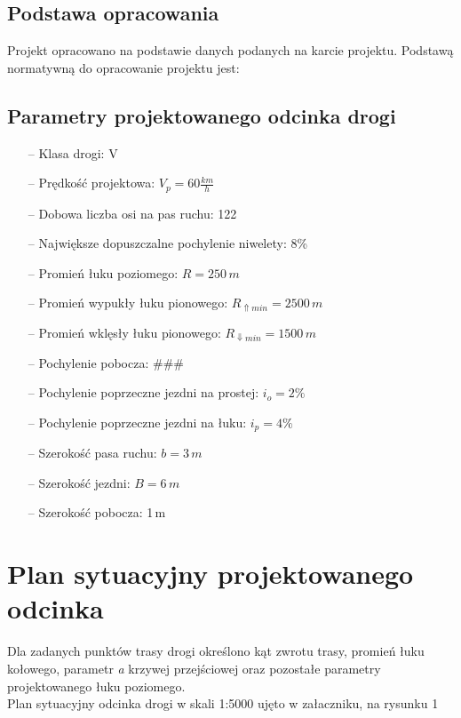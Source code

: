 \documentclass[12pt]{article}
\begin{document}
    \subsection{Podstawa opracowania}
    Projekt opracowano na podstawie danych podanych na karcie projektu.
    Podstawą normatywną do opracowanie projektu jest: 
    
    \selectfont{"Rozporządzenie Ministra Transportu i Gospodarki Morskiej z dnia 2 Marca 1999r.\\
    w sprawie warunków technicznych jakim powinny odpowiadać drogi publiczne\\ i ich usytuowanie"\qquad Dz. U. Nr 43 poz.430}
\newpage

    \subsection{Parametry projektowanego odcinka drogi}
    \begin{itemize}
        \item [--] Klasa drogi: V
        \item [--] Prędkość projektowa: \(V_{p}=60\frac{km}{h}\)
        \item [--] Dobowa liczba osi na pas ruchu: 122
        \item [--] Największe dopuszczalne pochylenie niwelety: 8\%
        \item [--] Promień łuku poziomego: \(R=250\,m\)
        \item [--] Promień wypukły łuku pionowego: \(R_{\Uparrow min} = 2500\,m\)
        \item [--] Promień wklęsły łuku pionowego: \(R_{\Downarrow min} = 1500\,m\)
        \item [--] Pochylenie pobocza: \#\#\#
        \item [--] Pochylenie poprzeczne jezdni na prostej: \( i_{o}=2\% \)
        \item [--] Pochylenie poprzeczne jezdni na łuku: \( i_{p}=4\% \)
        \item [--] Szerokość pasa ruchu: \(b=3\,m \)
        \item [--] Szerokość jezdni: \(B=6\,m\)
        \item [--] Szerokość pobocza: 1\,m
    \end{itemize}
    \newpage

\section{Plan sytuacyjny projektowanego odcinka}
    \quad Dla zadanych punktów trasy drogi określono kąt zwrotu trasy, promień łuku kołowego, parametr \textit{a} krzywej przejściowej oraz pozostałe parametry projektowanego łuku poziomego.\\
    \quad Plan sytuacyjny odcinka drogi w skali 1:5000 ujęto w załaczniku, na rysunku 1
    
\end{document}
